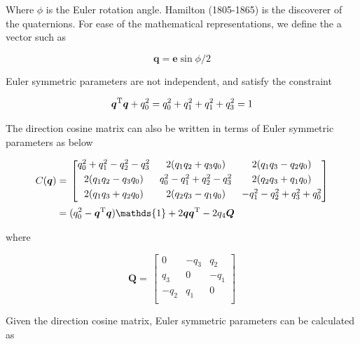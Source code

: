 Where $\phi$ is the Euler rotation angle. Hamilton (1805-1865) is the discoverer 
of the quaternions. For ease of the mathematical representations, we define the a vector such as

\begin{equation}
\label{eqn:quat3}
\bm{q} = \bm{e}\sin{\phi/2}
\end{equation}

Euler symmetric parameters are not independent, and satisfy the constraint

\begin{equation}
\label{eqn:quatNormConstraint}
\bm{q}^{\rm T} \bm{q} + q_0^2 = q_0^2 + q_1^2 +q_1^2 +q_3^2 = 1
\end{equation}

The direction cosine matrix can also be written in terms of Euler symmetric parameters as below

\begin{align}\label{eqn:Cquat}
\begin{split}
C(\bm{q})
 & =\,
\begin{bmatrix}
q_0^2 + q_1^2 - q_2^2 - q_3^2 & 2(q_1 q_2 + q_3 q_0) & 2(q_1 q_3 - q_2 q_0)\\[0.3em]
2(q_1 q_2 - q_3 q_0) & q_0^2 - q_1^2 + q_2^2 - q_3^2 & 2(q_2 q_3 + q_1 q_0)\\[0.3em]
2(q_1 q_3 + q_2 q_0) & 2(q_2 q_3 - q_1 q_0) & -q_1^2 - q_2^2 + q_3^2 + q_0^2\\[0.3em]
\end{bmatrix}
\\
& = (q_0^2 - \bm{q}^{\rm T}\bm{q} )\mathds{1} + 2\bm{q}\bm{q}^{\rm T} - 2q_4\bm{Q}
\end{split}
\end{align}
 
where

\begin{equation}
\label{eqn:Qmatrix}
\bm{Q}
=\,
\begin{bmatrix}
0 & - q_3 & q_2 \\[0.3em]
q_3 & 0 & - q_1 \\[0.3em]
- q_2 & q_1 & 0\\[0.3em]
\end{bmatrix}
\end{equation}

Given the direction cosine matrix, Euler symmetric parameters can be calculated as

